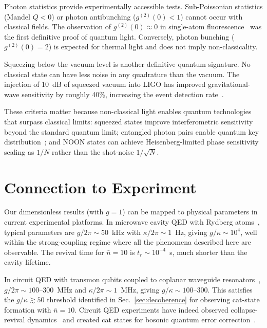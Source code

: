 \documentclass[%
 reprint,
 amsmath,amssymb,
 aps,
]{revtex4-2}
\begin{document}
Photon statistics provide experimentally accessible tests. Sub-Poissonian statistics (Mandel $Q < 0$) or photon antibunching ($g^{(2)}(0) < 1$) cannot occur with classical fields. The observation of $g^{(2)}(0) \approx 0$ in single-atom fluorescence~\cite{kimble1977} was the first definitive proof of quantum light. Conversely, photon bunching ($g^{(2)}(0) = 2$) is expected for thermal light and does not imply non-classicality.

Squeezing below the vacuum level is another definitive quantum signature. No classical state can have less noise in any quadrature than the vacuum. The injection of 10~dB of squeezed vacuum into LIGO has improved gravitational-wave sensitivity by roughly 40\%, increasing the event detection rate~\cite{tse2019}.

These criteria matter because non-classical light enables quantum technologies that surpass classical limits: squeezed states improve interferometric sensitivity beyond the standard quantum limit; entangled photon pairs enable quantum key distribution~\cite{ekert1991}; and NOON states can achieve Heisenberg-limited phase sensitivity scaling as $1/N$ rather than the shot-noise $1/\sqrt{N}$.


\section{Connection to Experiment}
\label{sec:experiment}

Our dimensionless results (with $g = 1$) can be mapped to physical parameters in current experimental platforms. In microwave cavity QED with Rydberg atoms~\cite{haroche2006}, typical parameters are $g/2\pi \sim 50$~kHz with $\kappa/2\pi \sim 1$~Hz, giving $g/\kappa \sim 10^4$, well within the strong-coupling regime where all the phenomena described here are observable. The revival time for $\bar{n} = 10$ is $t_r \sim 10^{-4}$~s, much shorter than the cavity lifetime.

In circuit QED with transmon qubits coupled to coplanar waveguide resonators~\cite{blais2021}, $g/2\pi \sim 100$--300~MHz and $\kappa/2\pi \sim 1$~MHz, giving $g/\kappa \sim 100$--300. This satisfies the $g/\kappa \gtrsim 50$ threshold identified in Sec.~\ref{sec:decoherence} for observing cat-state formation with $\bar{n} = 10$. Circuit QED experiments have indeed observed collapse-revival dynamics~\cite{hofheinz2009} and created cat states for bosonic quantum error correction~\cite{ofek2016}.
\end{document}
